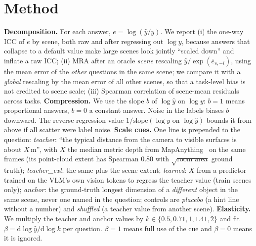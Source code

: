 \documentclass[10pt,twocolumn,letterpaper]{article}
\begin{document}
\section{Method}
\textbf{Decomposition.} For each answer, $e=\log(\hat y/y)$. We report (i) the one-way ICC of $e$ by scene,
both raw and after regressing out $\log y$, because answers that collapse to a default value make large
scenes look jointly ``scaled down'' and inflate a raw ICC; (ii) MRA after an oracle
\emph{scene} rescaling $\hat y/\exp(\bar e_{s,-i})$, using the mean error of the \emph{other} questions in the same scene;
we compare it with a \emph{global} rescaling by the mean error of all other scenes, so that a task-level bias is not
credited to scene scale; (iii) Spearman correlation of scene-mean residuals across tasks.
\textbf{Compression.} We use the slope $b$ of $\log\hat y$ on $\log y$: $b{=}1$ means proportional answers, $b{=}0$ a constant
answer. Noise in the labels biases $b$ downward. The reverse-regression value $1/\text{slope}(\log y \text{ on } \log\hat y)$
bounds it from above if all scatter were label noise.
\textbf{Scale cues.} One line is prepended to the question:
\emph{teacher}: ``the typical distance from the camera to visible surfaces is about $X$\,m'', with $X$ the
median metric depth from MapAnything~\cite{keetha2025mapanything} on the same frames (its point-cloud extent has
Spearman $0.80$ with $\sqrt{\text{room area}}$ ground truth);
\emph{teacher\_ext}: the same plus the scene extent;
\emph{learned}: $X$ from a predictor trained on the VLM's own vision tokens to regress the teacher value (train scenes only);
\emph{anchor}: the ground-truth longest dimension of a \emph{different} object in the same scene, never one named in the question;
controls are \emph{placebo} (a hint line without a number) and \emph{shuffled} (a teacher value from another scene).
\textbf{Elasticity.} We multiply the teacher and anchor values by $k\in\{0.5,0.71,1,1.41,2\}$ and fit
$\beta=\mathrm{d}\log\hat y/\mathrm{d}\log k$ per question. $\beta{=}1$ means full use of the cue and $\beta{=}0$ means it is ignored.
\end{document}
